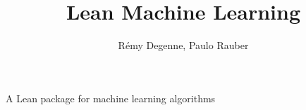 \documentclass{report}
\title{Lean Machine Learning}
\author{Rémy Degenne, Paulo Rauber}
\begin{document}
\maketitle

\begin{center}
  \Large{A Lean package for machine learning algorithms}
\end{center}


\end{document}
